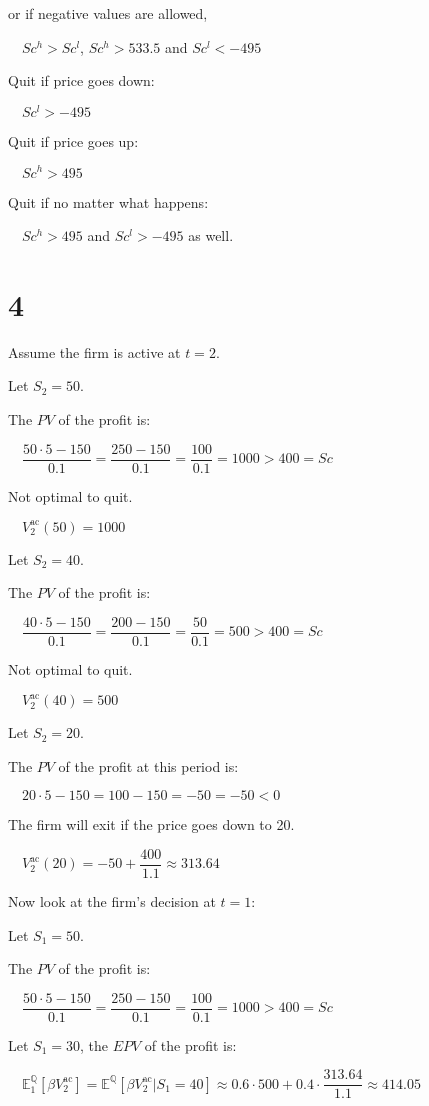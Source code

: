 \documentclass{article}
\begin{document}
or if negative values are allowed,

$\quad Sc^{h}>Sc^{l}$, $Sc^{h}>533.5$ and $Sc^{l}<-495$

Quit if price goes down:

$\quad Sc^{l}>-495$

Quit if price goes up:

$\quad Sc^{h}>495$

Quit if no matter what happens:

$\quad Sc^{h}>495$ and $Sc^{l}>-495$ as well.

\section*{4}

Assume the firm is active at $t=2$.

Let $S_{2}=50$.

The $PV$ of the profit is: 

$\quad \dfrac{50\cdot5-150}{0.1}=\dfrac{250-150}{0.1}=\dfrac{100}{0.1}=1000>400=Sc$

Not optimal to quit.

$\quad V^{\text{ac}}_{2}\left(50\right)=1000$

Let $S_{2}=40$.

The $PV$ of the profit is: 

$\quad \dfrac{40\cdot5-150}{0.1}=\dfrac{200-150}{0.1}=\dfrac{50}{0.1}=500>400=Sc$

Not optimal to quit.

$\quad V^{\text{ac}}_{2}\left(40\right)=500$

Let $S_{2}=20$.

The $PV$ of the profit at this period is: 

$\quad 20\cdot5-150=100-150=-50=-50<0$

The firm will exit if the price goes down to 20. 

$\quad V^{\text{ac}}_{2}\left(20\right)=-50+\dfrac{400}{1.1}\approx313.64$

Now look at the firm's decision at $t=1$:

Let $S_{1}=50$.

The $PV$ of the profit is:

$\quad \dfrac{50\cdot5-150}{0.1}=\dfrac{250-150}{0.1}=\dfrac{100}{0.1}=1000>400=Sc$

Let $S_{1}=30$, the $EPV$ of the profit is:

$\quad \mathbb{E} ^{\mathbb{Q} }_{1}\left[\beta V^{\text{ac}}_{2}\right]=\mathbb{E} ^{\mathbb{Q} }\left[\beta V^{\text{ac}}_{2}|S_{1}=40\right]\approx0.6\cdot500+0.4\cdot\dfrac{313.64}{1.1}\approx414.05$
\end{document}
